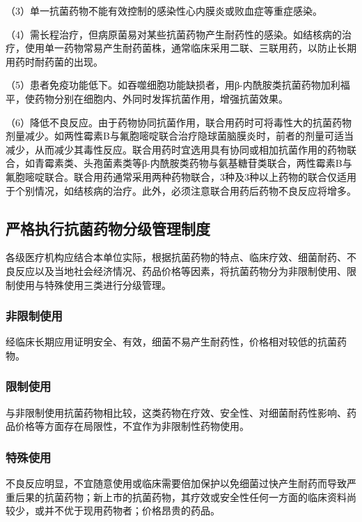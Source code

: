 （3）单一抗菌药物不能有效控制的感染性心内膜炎或败血症等重症感染。

（4）需长程治疗，但病原菌易对某些抗菌药物产生耐药性的感染。如结核病的治疗，使用单一药物常易产生耐药菌株，通常临床采用二联、三联用药，以防止长期用药时耐药菌的出现。

（5）患者免疫功能低下。如吞噬细胞功能缺损者，用β-内酰胺类抗菌药物加利福平，使药物分别在细胞内、外同时发挥抗菌作用，增强抗菌效果。

（6）降低不良反应。由于药物协同抗菌作用，联合用药时可将毒性大的抗菌药物剂量减少。如两性霉素B与氟胞嘧啶联合治疗隐球菌脑膜炎时，前者的剂量可适当减少，从而减少其毒性反应。联合用药时宜选用具有协同或相加抗菌作用的药物联合，如青霉素类、头孢菌素类等β-内酰胺类药物与氨基糖苷类联合，两性霉素B与氟胞嘧啶联合。联合用药通常采用两种药物联合，3种及3种以上药物的联合仅适用于个别情况，如结核病的治疗。此外，必须注意联合用药后药物不良反应将增多。

\subsection{严格执行抗菌药物分级管理制度}

各级医疗机构应结合本单位实际，根据抗菌药物的特点、临床疗效、细菌耐药、不良反应以及当地社会经济情况、药品价格等因素，将抗菌药物分为非限制使用、限制使用与特殊使用三类进行分级管理。

\subsubsection{非限制使用}

经临床长期应用证明安全、有效，细菌不易产生耐药性，价格相对较低的抗菌药物。

\subsubsection{限制使用}

与非限制使用抗菌药物相比较，这类药物在疗效、安全性、对细菌耐药性影响、药品价格等方面存在局限性，不宜作为非限制性药物使用。

\subsubsection{特殊使用}

不良反应明显，不宜随意使用或临床需要倍加保护以免细菌过快产生耐药而导致严重后果的抗菌药物；新上市的抗菌药物，其疗效或安全性任何一方面的临床资料尚较少，或并不优于现用药物者；价格昂贵的药品。

